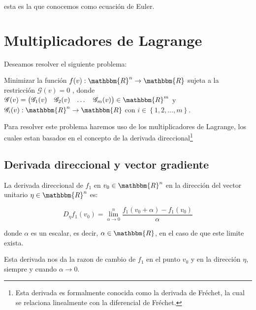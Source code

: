     esta es la que conocemos como ecuación de Euler.

    \newpage
    \section{Multiplicadores de Lagrange}

    Deseamos resolver el siguiente problema:

    Minimizar la función
    $f(v):\mathbbm{R}^n \to \mathbbm{R}$
    sujeta a la restricción $\mathscr{G}(v) = 0$
    , donde $\mathscr{G}(v)=\begin{pmatrix}\mathscr{G}_1(v) & \mathscr{G}_2(v) & \dots & \mathscr{G}_m(v) \end{pmatrix} \in \mathbbm{R}^m$
     y $\mathscr{G}_i(v): \mathbbm{R}^n \to \mathbbm{R}$
     con $i \in \left\{ 1, 2, \dots, m \right\}$.

    Para resolver este problema haremos uso de los multiplicadores de Lagrange, los cuales estan basados en el concepto de la derivada direccional\footnote{Esta derivada es formalmente conocida como la derivada de Fréchet, la cual se relaciona linealmente con la diferencial de Fréchet.}

        \subsection{Derivada direccional y vector gradiente}

        \begin{definicion}
            La derivada direccional de $f_1$ en $v_0 \in \mathbbm{R}^n$ en la dirección del vector unitario $\eta \in \mathbbm{R}^n$ es:

            \begin{equation}
                D_{\eta} f_1(v_0) = \lim_{\alpha \to 0}^{n}  \frac{f_1(v_0 + \alpha) - f_1(v_0)}{\alpha}
            \end{equation}

            donde $\alpha$ es un escalar, es decir, $\alpha \in \mathbbm{R}$, en el caso de que este limite exista.



            Esta derivada nos da la razon de cambio de $f_1$ en el punto $v_0$ y en la dirección $\eta$, siempre y cuando $\alpha \to 0$.
        \end{definicion}

